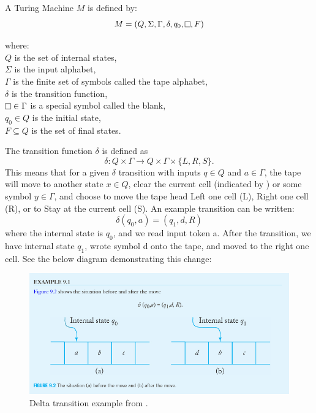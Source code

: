 \begin{definition}
    A Turing Machine $M$ is defined by:
        \[M = (Q, \Sigma ,\Gamma, \delta, q_{0}, \raisebox{0.1cm}{\fbox{}}, F)\]
        \par \hangindent=3cm 
        where: \\
        \( Q \) is the set of internal states,\\
        \( \Sigma \) is the input alphabet,\\
        \( \Gamma \) is the finite set of symbols called the tape alphabet,\\
        \( \delta \) is the transition function,\\
        \( \raisebox{0.1cm}{\fbox{}} \in \Gamma \) is a special symbol called the blank,\\
        \( q_{0} \in Q \) is the initial state,\\
        \( F \subseteq Q \) is the set of final states.
\end{definition}

The transition function $\delta$ is defined as \[\delta: Q \times \Gamma \rightarrow Q \times \Gamma \times \{L, R, S\}.\]
This means that for a given $\delta$ transition with inputs $q \in Q$ and $a \in \Gamma$, the tape will move to another state $x \in Q$, clear the current cell (indicated by \raisebox{0.1cm}{\fbox{}}) or some symbol $y \in \Gamma$, and choose to move the tape head Left one cell (L), Right one cell (R), or to Stay at the current cell (S).
An example transition can be written: \[\delta(q_{0}, a) = (q_{1}, d, R)\] where the internal state is $q_{0}$, and we read input token a.
After the transition, we have internal state $q_{1}$, wrote symbol d onto the tape, and moved to the right one cell.
See the below diagram demonstrating this change:

\begin{figure}[htb]
    \centering
    \includegraphics[width=16cm]{Images/deltatransition.png}
       \caption{Delta transition example from \cite{IntroFormLangAuto}.}
           \label{Fig:DeltaTransition}
\end{figure}

